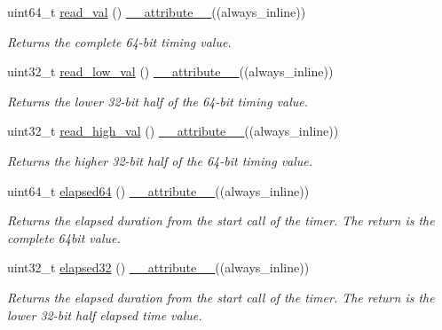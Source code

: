 \begin{DoxyCompactItemize}
uint64\+\_\+t \hyperlink{classPIT__LifetimeTimer_a4ee08cce7812322a7a10fcba0463476c}{read\+\_\+val} () \hyperlink{utilities_8hpp_a103d5b3998e0dd804213c8f30a094f4d}{\+\_\+\+\_\+attribute\+\_\+\+\_\+}((always\+\_\+inline))
\begin{DoxyCompactList}\small\item\em Returns the complete 64-\/bit timing value. \end{DoxyCompactList}\item 
uint32\+\_\+t \hyperlink{classPIT__LifetimeTimer_a4f7f8cd3847b9edb19dfa27f048a08cc}{read\+\_\+low\+\_\+val} () \hyperlink{utilities_8hpp_a103d5b3998e0dd804213c8f30a094f4d}{\+\_\+\+\_\+attribute\+\_\+\+\_\+}((always\+\_\+inline))
\begin{DoxyCompactList}\small\item\em Returns the lower 32-\/bit half of the 64-\/bit timing value. \end{DoxyCompactList}\item 
uint32\+\_\+t \hyperlink{classPIT__LifetimeTimer_a39b0861ac88aec5e53f326409d536bcf}{read\+\_\+high\+\_\+val} () \hyperlink{utilities_8hpp_a103d5b3998e0dd804213c8f30a094f4d}{\+\_\+\+\_\+attribute\+\_\+\+\_\+}((always\+\_\+inline))
\begin{DoxyCompactList}\small\item\em Returns the higher 32-\/bit half of the 64-\/bit timing value. \end{DoxyCompactList}\item 
uint64\+\_\+t \hyperlink{classPIT__LifetimeTimer_a04adf2272a47d4c81a28c6363e2da4fd}{elapsed64} () \hyperlink{utilities_8hpp_a103d5b3998e0dd804213c8f30a094f4d}{\+\_\+\+\_\+attribute\+\_\+\+\_\+}((always\+\_\+inline))
\begin{DoxyCompactList}\small\item\em Returns the elapsed duration from the start call of the timer. The return is the complete 64bit value. \end{DoxyCompactList}\item 
uint32\+\_\+t \hyperlink{classPIT__LifetimeTimer_af7481214070333f845a23456b4d75880}{elapsed32} () \hyperlink{utilities_8hpp_a103d5b3998e0dd804213c8f30a094f4d}{\+\_\+\+\_\+attribute\+\_\+\+\_\+}((always\+\_\+inline))
\begin{DoxyCompactList}\small\item\em Returns the elapsed duration from the start call of the timer. The return is the lower 32-\/bit half elapsed time value. \end{DoxyCompactList}\end{DoxyCompactItemize}
